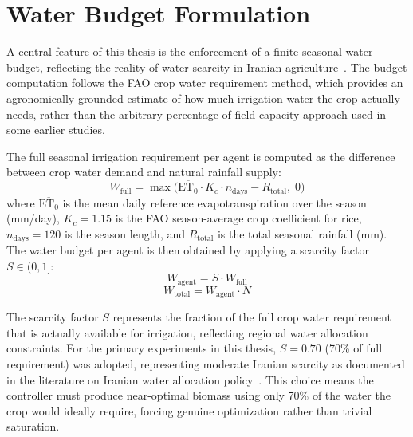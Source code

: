 \section{Water Budget Formulation}
\label{sec:water_budget}

A central feature of this thesis is the enforcement of a finite seasonal water budget, reflecting the reality of water scarcity in Iranian agriculture~\cite{nouri2023,mesgaran2018}. The budget computation follows the FAO crop water requirement method, which provides an agronomically grounded estimate of how much irrigation water the crop actually needs, rather than the arbitrary percentage-of-field-capacity approach used in some earlier studies.

The full seasonal irrigation requirement per agent is computed as the difference between crop water demand and natural rainfall supply:
\begin{equation}
    W_{\text{full}} = \max\!\bigl(\overline{\text{ET}_0} \cdot K_c \cdot n_{\text{days}} - R_{\text{total}},\; 0\bigr)
    \label{eq:wfull}
\end{equation}
where $\overline{\text{ET}_0}$ is the mean daily reference evapotranspiration over the season (mm/day), $K_c = 1.15$ is the FAO season-average crop coefficient for rice, $n_{\text{days}} = 120$ is the season length, and $R_{\text{total}}$ is the total seasonal rainfall (mm). The water budget per agent is then obtained by applying a scarcity factor $S \in (0, 1]$:
\begin{equation}
    W_{\text{agent}} = S \cdot W_{\text{full}}
    \label{eq:wagent}
\end{equation}
\begin{equation}
    W_{\text{total}} = W_{\text{agent}} \cdot N
    \label{eq:wtotal}
\end{equation}

The scarcity factor $S$ represents the fraction of the full crop water requirement that is actually available for irrigation, reflecting regional water allocation constraints. For the primary experiments in this thesis, $S = 0.70$ (70\% of full requirement) was adopted, representing moderate Iranian scarcity as documented in the literature on Iranian water allocation policy~\cite{afrasiabikia2026}. This choice means the controller must produce near-optimal biomass using only 70\% of the water the crop would ideally require, forcing genuine optimization rather than trivial saturation.

